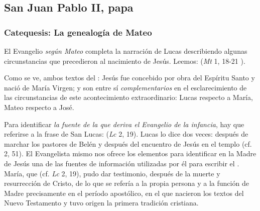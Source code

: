 \newsection			

		\subsection{San Juan Pablo II, papa}

			\subsubsection{Catequesis: La genealogía de Mateo}
			
				
				\begin{body}
					El Evangelio \emph{según Mateo} completa la narración de Lucas describiendo algunas circunstancias que precedieron al nacimiento de Jesús. Leemos:  (\emph{Mt} 1, 18-21 ).
					
					Como se ve, ambos textos del : Jesús fue concebido por obra del Espíritu Santo y nació de María Virgen; y son entre sí \emph{complementarios} en el esclarecimiento de las circunstancias de este acontecimiento extraordinario: Lucas respecto a María, Mateo respecto a José.
					
					Para identificar \emph{la fuente de la que deriva el Evangelio de la infancia}, hay que referirse a la frase de San Lucas:  (\emph{Lc} 2, 19). Lucas lo dice dos veces: después de marchar los pastores de Belén y después del encuentro de Jesús en el templo (cf. 2, 51). El Evangelista mismo nos ofrece los elementos para identificar en la Madre de Jesús una de las fuentes de información utilizadas por él para escribir el . María, que  (cf. \emph{Lc} 2, 19), pudo dar testimonio, después de la muerte y resurrección de Cristo, de lo que se refería a la propia persona y a la función de Madre precisamente en el período apostólico, en el que nacieron los textos del Nuevo Testamento y tuvo origen la primera tradición cristiana.
					

\end{body}
